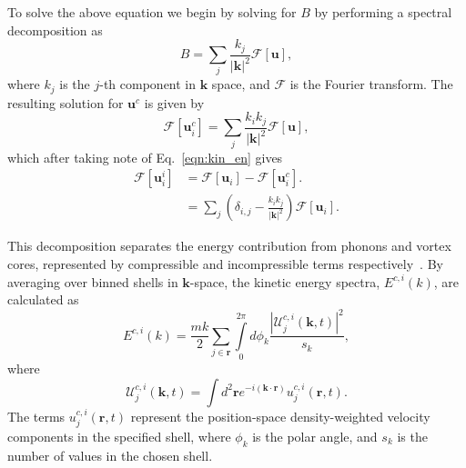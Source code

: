 To solve the above equation we begin by solving for $B$ by performing a spectral decomposition as
\begin{equation}
    B = \displaystyle\sum\limits_{j} \frac{k_j}{|\mathbf{k}|^2}\mathscr{F}[\mathbf{u}],
\end{equation}
where $k_j$ is the $j$-th component in $\mathbf{k}$ space, and $\mathscr{F}$ is the Fourier transform. The resulting solution for $\mathbf{u}^c$ is given by
\begin{equation}
    \mathscr{F}[\mathbf{u}_i^c] = \displaystyle\sum\limits_{j} \frac{k_i k_j}{|\mathbf{k}|^2} \mathscr{F}[\mathbf{u}],
\end{equation}
which after taking note of Eq.~\eqref{eqn:kin_en} gives
\begin{align}
    \mathscr{F}[\mathbf{u}_i^i] &= \mathscr{F}[\mathbf{u}_i] - \mathscr{F}[\mathbf{u}_i^c]. \\
    &= \displaystyle\sum\limits_{j}\left(\delta_{i,j} - \frac{k_ik_j}{|\mathbf{k}|^2}\right)\mathscr{F}[\mathbf{u}_i].
\end{align}

This decomposition separates the energy contribution from phonons and vortex cores, represented by compressible and incompressible terms respectively~\cite{CT:Horng_pra_2009}. By averaging over binned shells in $\mathbf{k}$-space, the kinetic energy spectra, $E^{c,i}(k)$, are calculated as~\cite{CT:Bradley_prx_2012}
\begin{equation}
	E^{c,i}(k) = \frac{mk}{2}\sum\limits_{j\in\mathbf{r}} \int\limits_{0}^{2\pi}d\phi_k \frac{ |\mathcal{U}_j^{c,i}(\mathbf{k},t) |^2}{s_k},
\end{equation}
where
\begin{equation}
	\mathcal{U}_j^{c,i}(\mathbf{k},t) = \int d^2 \mathbf{r} e^{-i(\mathbf{k}\cdot\mathbf{r})} u_j^{c,i}(\mathbf{r},t).
\end{equation}
The terms $u_j^{c,i}(\mathbf{r},t)$ represent the position-space density-weighted velocity components in the specified shell, where $\phi_k$ is the polar angle, and $s_k$ is the number of values in the chosen shell.
\fi

